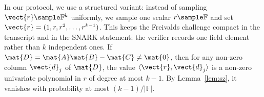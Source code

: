 In our protocol, we use a structured variant: instead of sampling $\vect{r} \sample \mathbb{F}^k$ uniformly, we sample one scalar $r \sample \mathbb{F}$ and set $\vect{r} = (1, r, r^2, \ldots, r^{k-1})$.
This keeps the Freivalds challenge compact in the transcript and in the SNARK
statement: the verifier records one field element rather than $k$ independent
ones. If $\mat{D} = \mat{A}\mat{B} - \mat{C} \neq \mat{0}$, then for any non-zero
column $\vect{d}_j$ of $\mat{D}$, the value $\langle \vect{r}, \vect{d}_j \rangle$ is a non-zero univariate polynomial in
$r$ of degree at most $k-1$.
By Lemma~\ref{lem:sz}, it vanishes with probability at most $(k-1)/|\mathbb{F}|$.
